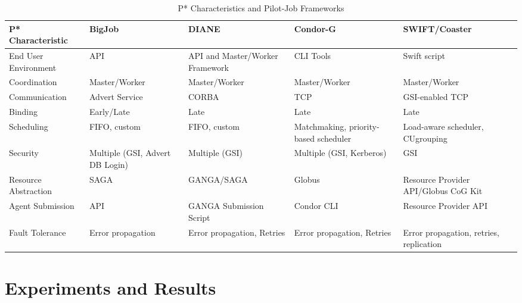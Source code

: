 \documentclass[conference,final]{IEEEtran}
\newcommand{\cu}{CU}
\newcommand{\upp}{\vspace*{-0.5em}}
\begin{document}
\begin{table}[t]
\centering
\begin{tabular}{|l|p{2.5cm}|p{2.5cm}|p{2.5cm}|p{2.5cm}|}
	\hline
	\textbf{P* Characteristic}
	&\textbf{BigJob} &\textbf{DIANE} &\textbf{Condor-G} &   
	\textbf{SWIFT/Coaster} \\ \hline
End User Environment &API &API and Master/Worker Framework &CLI Tools &Swift script\\ \hline

Coordination &Master/Worker  &Master/Worker  &Master/Worker &Master/Worker \\ \hline
	
Communication &Advert Service &CORBA &TCP &GSI-enabled TCP \\ \hline

Binding &Early/Late &Late &Late &Late\\
\hline
Scheduling &FIFO, custom &FIFO, custom &Matchmaking, priority-based scheduler 
&Load-aware scheduler, \cu  grouping\\
\hline

Security &Multiple (GSI, Advert DB Login) &Multiple (GSI) &Multiple (GSI, 
Kerberos) &GSI\\ \hline

Resource Abstraction &SAGA &GANGA/SAGA &Globus &Resource Provider API/Globus CoG 
Kit \\ 
\hline
Agent Submission &API &GANGA Submission Script &Condor CLI 
&Resource Provider API\\
\hline
Fault Tolerance &Error propagation &Error propagation, Retries &Error propagation, Retries &Error propagation, retries, replication\\
\hline
	
\end{tabular}
\caption{P* Characteristics and Pilot-Job Frameworks\upp\upp}\label{table:pilot-job-comparison}
\end{table}

\upp

\section{Experiments and Results\upp\upp}
\label{sec:exp_res}
\end{document}
